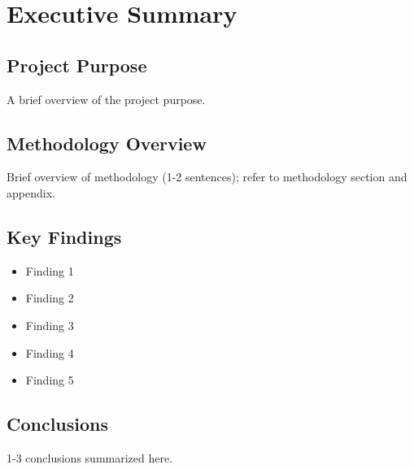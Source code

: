 \chapter{Executive Summary}

\section{Project Purpose}
A brief overview of the project purpose.

\section{Methodology Overview}
Brief overview of methodology (1-2 sentences); refer to methodology section and appendix.

\section{Key Findings}
\begin{itemize}
    \item Finding 1
    \item Finding 2
    \item Finding 3
    \item Finding 4
    \item Finding 5
\end{itemize}

\section{Conclusions}
1-3 conclusions summarized here.
